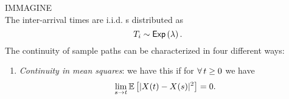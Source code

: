 \documentclass{report}
\begin{document}
	IMMAGINE\\
	The inter-arrival times are i.i.d. \rv s distributed as
	\begin{equation*}
		T_i\sim\mathsf{Exp}\left(\lambda\right).
	\end{equation*}
	The continuity of sample paths can be characterized in four different ways:
	\begin{enumerate}
		\item \emph{Continuity in mean squares}: we have this if for $\forall\, t\geq0$ we have
		\begin{equation*}
			\lim_{s\to t}\mathbb{E}\left[|X(t)-X(s)|^{2}\right]=0.
		\end{equation*}
	\end{enumerate}
\clearpage
\listoffigures  
\end{document}
